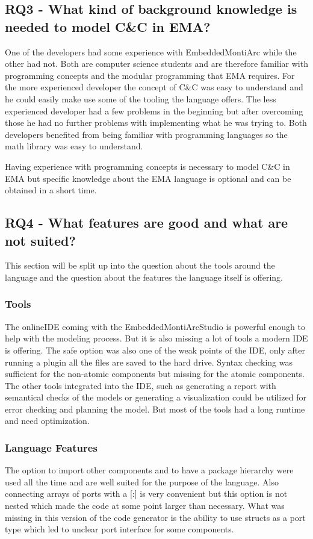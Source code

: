 \subsection{RQ3 - What kind of background knowledge is needed to model C\&C in EMA?}
One of the developers had some experience with EmbeddedMontiArc while the other had not. Both are computer science students and are therefore familiar with programming concepts and the modular programming that EMA requires. For the more experienced developer the concept of C\&C was easy to understand and he could easily make use some of the tooling the language offers. The less experienced developer had a few problems in the beginning but after overcoming those he had no further problems with implementing what he was trying to. Both developers benefited from being familiar with programming languages so the math library was easy to understand. 

Having experience with programming concepts is necessary to model C\&C in EMA but specific knowledge about the EMA language is optional and can be obtained in a short time.

\subsection{RQ4 - What features are good and what are not suited?}
This section will be split up into the question about the tools around the language and the question about the features the language itself is offering.

\subsubsection{Tools}
The onlineIDE coming with the EmbeddedMontiArcStudio is powerful enough to help with the modeling process. But it is also missing a lot of tools a modern IDE is offering. The safe option was also one of the weak points of the IDE, only after running a plugin all the files are saved to the hard drive. Syntax checking was sufficient for the non-atomic components but missing for the atomic components. The other tools integrated into the IDE, such as generating a report with semantical checks of the models or generating a visualization could be utilized for error checking and planning the model. But most of the tools had a long runtime and need optimization.

\subsubsection{Language Features}
The option to import other components and to have a package hierarchy were used all the time and are well suited for the purpose of the language. Also connecting arrays of ports with a [:] is very convenient but this option is not nested which made the code at some point larger than necessary. What was missing in this version of the code generator is the ability to use structs as a port type which led to unclear port interface for some components.

